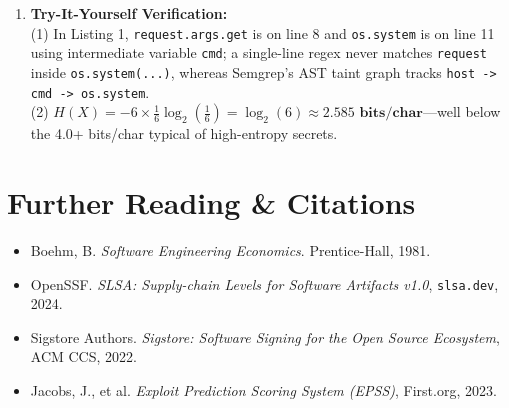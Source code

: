 \begin{enumerate}[leftmargin=18pt]
  \item \textbf{Try-It-Yourself Verification:}\\
  (1) In Listing 1, \texttt{request.args.get} is on line 8 and \texttt{os.system} is on line 11 using intermediate variable \texttt{cmd}; a single-line regex never matches \texttt{request} inside \texttt{os.system(...)}, whereas Semgrep's AST taint graph tracks \texttt{host -> cmd -> os.system}.\\
  (2) $H(X) = -6 \times \frac{1}{6} \log_2\!\left(\frac{1}{6}\right) = \log_2(6) \approx \mathbf{2.585\text{ bits/char}}$—well below the 4.0+ bits/char typical of high-entropy secrets.
\end{enumerate}

\section{Further Reading \protect\& Citations}
\begin{itemize}[leftmargin=15pt]
  \item Boehm, B. \emph{Software Engineering Economics}. Prentice-Hall, 1981.
  \item OpenSSF. \emph{SLSA: Supply-chain Levels for Software Artifacts v1.0}, \texttt{slsa.dev}, 2024.
  \item Sigstore Authors. \emph{Sigstore: Software Signing for the Open Source Ecosystem}, ACM CCS, 2022.
  \item Jacobs, J., et al. \emph{Exploit Prediction Scoring System (EPSS)}, First.org, 2023.
\end{itemize}
